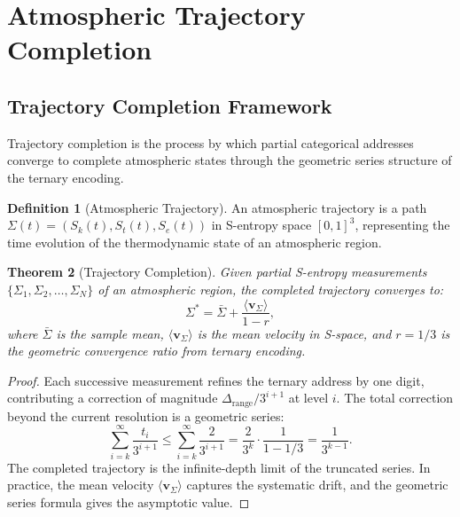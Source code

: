 \documentclass[twocolumn,10pt]{article}
\newtheorem{theorem}{Theorem}[section]
\theoremstyle{definition}
\newtheorem{definition}[theorem]{Definition}
\newcommand{\Sk}{S_k}
\newcommand{\St}{S_t}
\newcommand{\Se}{S_e}
\begin{document}
\section{Atmospheric Trajectory Completion}\label{sec:trajectory_completion}

\subsection{Trajectory Completion Framework}

Trajectory completion is the process by which partial categorical addresses converge to complete atmospheric states through the geometric series structure of the ternary encoding.

\begin{definition}[Atmospheric Trajectory]\label{def:trajectory}
An atmospheric trajectory is a path $\Sigma(t) = (\Sk(t), \St(t), \Se(t))$ in S-entropy space $[0,1]^3$, representing the time evolution of the thermodynamic state of an atmospheric region.
\end{definition}

\begin{theorem}[Trajectory Completion]\label{thm:completion}
Given partial S-entropy measurements $\{\Sigma_1, \Sigma_2, \ldots, \Sigma_N\}$ of an atmospheric region, the completed trajectory converges to:
\begin{equation}\label{eq:completion}
    \Sigma^* = \bar{\Sigma} + \frac{\langle\mathbf{v}_\Sigma\rangle}{1 - r},
\end{equation}
where $\bar{\Sigma}$ is the sample mean, $\langle\mathbf{v}_\Sigma\rangle$ is the mean velocity in S-space, and $r = 1/3$ is the geometric convergence ratio from ternary encoding.
\end{theorem}

\begin{proof}
Each successive measurement refines the ternary address by one digit, contributing a correction of magnitude $\Delta_{\mathrm{range}}/3^{i+1}$ at level $i$. The total correction beyond the current resolution is a geometric series:
\begin{equation}
    \sum_{i=k}^{\infty} \frac{t_i}{3^{i+1}} \leq \sum_{i=k}^{\infty} \frac{2}{3^{i+1}} = \frac{2}{3^k} \cdot \frac{1}{1 - 1/3} = \frac{1}{3^{k-1}}.
\end{equation}
The completed trajectory is the infinite-depth limit of the truncated series. In practice, the mean velocity $\langle\mathbf{v}_\Sigma\rangle$ captures the systematic drift, and the geometric series formula gives the asymptotic value.
\end{proof}
\end{document}
